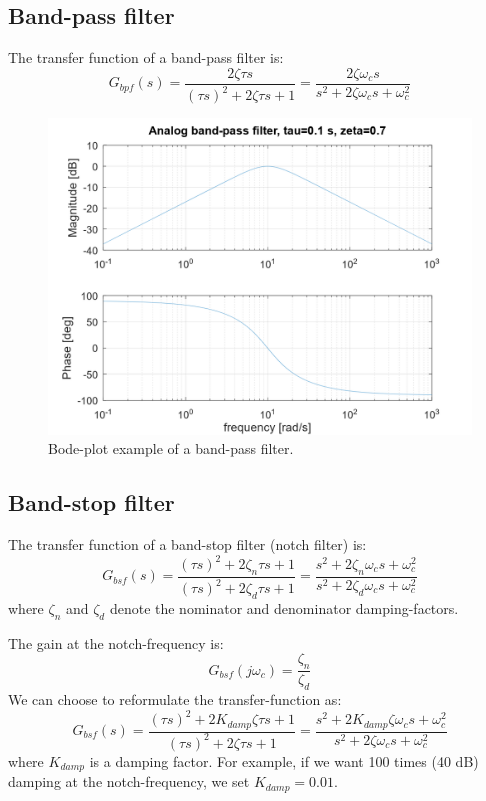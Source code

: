\documentclass[]{book}
\begin{document}
\hypertarget{band-pass-filter-1}{%
\subsection{Band-pass filter}\label{band-pass-filter-1}}

The transfer function of a band-pass filter is:
\[
G_{bpf}(s) =  \frac{2\zeta \tau s}{(\tau s)^2 + 2\zeta \tau s + 1} = \frac{2\zeta \omega_c s}{s^2 + 2\zeta \omega_c s + \omega_c^2}
\label{eq:bpf}
\]

\begin{figure}
\includegraphics[width=0.8\linewidth]{images/filters/bpf} \caption{Bode-plot example of a band-pass filter.}\label{fig:unnamed-chunk-6}
\end{figure}

\hypertarget{band-stop-filter}{%
\subsection{Band-stop filter}\label{band-stop-filter}}

The transfer function of a band-stop filter (notch filter) is:
\[
G_{bsf}(s) = \frac{(\tau s)^2 + 2\zeta_n \tau s + 1}{(\tau s)^2 + 2\zeta_d \tau s + 1} 
=\frac{s^2 + 2\zeta_n \omega_c s + \omega_c^2}{s^2 + 2\zeta_d \omega_c s + \omega_c^2}
\label{eq:bsf1}
\]
where \(\zeta_n\) and \(\zeta_d\) denote the nominator and denominator damping-factors.

The gain at the notch-frequency is:
\[
G_{bsf}(j\omega_c) = \frac{\zeta_n }{\zeta_d }
\label{eq:bsf2}
\]
We can choose to reformulate the transfer-function as:
\[
G_{bsf}(s) = \frac{(\tau s)^2 + 2K_{damp}\zeta \tau s + 1}{(\tau s)^2 + 2\zeta \tau s + 1} 
=\frac{s^2 + 2K_{damp}\zeta \omega_c s + \omega_c^2}{s^2 + 2\zeta \omega_c s + \omega_c^2}
\label{eq:bsf1}
\]
where \(K_{damp}\) is a damping factor. For example, if we want 100 times (40 dB) damping at the notch-frequency, we set \(K_{damp} = 0.01\).
\end{document}

